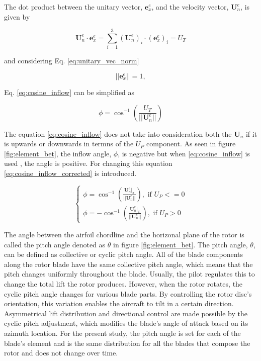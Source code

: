 The dot product between the unitary vector, $\mathbf{e}^e_x$, and the velocity vector, $\mathbf{U}_n^e$, is given by

\begin{equation}
    \mathbf{U}_n^e \cdot \mathbf{e}^e_x = \sum_ {i=1}^3 (\mathbf{U}_n^e)_i \cdot (\mathbf{e}_x^e)_i = U_T
\end{equation}

\noindent and considering Eq. \ref{eq:unitary_vec_norm}

\begin{equation}
    || \mathbf{e}^e_x || =  1,
    \label{eq:unitary_vec_norm}
\end{equation}

\noindent Eq. \ref{eq:cosine_inflow} can be simplified as

\begin{equation}
    \phi = \cos^{-1} \left( \frac{U_T}{||\mathbf{U}_n^e||}\right)
\end{equation}

The equation \ref{eq:cosine_inflow} does not take into consideration both the $\mathbf{U}_n$ if it is upwards or downwards in termns of the $U_P$ component. As seen in figure \ref{fig:element_bet}, the inflow angle, $\phi$, is negative but when \ref{eq:cosine_inflow} is used , the angle is positive. For changing this equation \ref{eq:cosine_inflow_corrected} is introduced.

\begin{equation}
    \begin{cases}
        \phi = \cos^{-1} \left( \frac{\mathbf{U}_n^e|_x}{||\mathbf{U}_n^e||}\right), \text{ if } U_P <= 0\\
        \phi = - \cos^{-1} \left( \frac{\mathbf{U}_n^e|_x}{||\mathbf{U}_n^e||}\right), \text{ if } U_P > 0
    \end{cases}
    \label{eq:cosine_inflow_corrected}
\end{equation}

The angle between the airfoil chordline and the horizonal plane of the rotor is called the pitch angle denoted as $\theta$ in figure \ref{fig:element_bet}. The pitch angle, $\theta$, can be defined as collective or cyclic pitch angle. All of the blade components along the rotor blade have the same collective pitch angle, which means that the pitch changes uniformly throughout the blade. Usually, the pilot regulates this to change the total lift the rotor produces. However, when the rotor rotates, the cyclic pitch angle changes for various blade parts. By controlling the rotor disc's orientation, this variation enables the aircraft to tilt in a certain direction. Asymmetrical lift distribution and directional control are made possible by the cyclic pitch adjustment, which modifies the blade's angle of attack based on its azimuth location. For the present study, the pitch angle is set for each of the blade's element and is the same distribution for all the blades that compose the rotor and does not change over time. 

